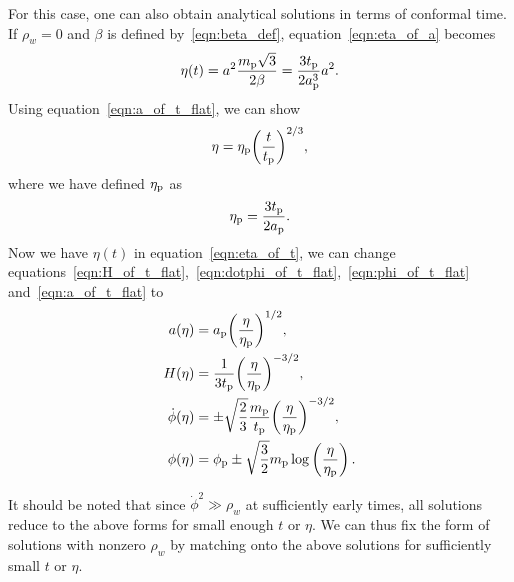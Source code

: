 For this case, one can also obtain analytical solutions in terms of conformal time.  If $\rho_w=0$ and $\beta$ is defined by~\eqref{eqn:beta_def}, equation~\eqref{eqn:eta_of_a} becomes
%
\begin{equation}
  \eta(t) 
  = 
  a^2 \frac{m_{\mathrm{p}}\sqrt{3}}{2\beta}
  =
  \frac{3t_{\mathrm{p}}}{2a_{\mathrm{p}}^3}a^2.
  \label{eqn:eta_of_t}
\end{equation}
%
Using equation~\eqref{eqn:a_of_t_flat}, we can show
%
\begin{equation}
  \eta
  =
  \eta_{\mathrm{p}}{\left(\frac{t}{t_{\mathrm{p}}}\right)}^{2/3},
\end{equation}
%
where we have defined $\eta_{\mathrm{p}}$ as
%
\begin{equation}
  \eta_{\mathrm{p}}
  =
  \frac{3t_{\mathrm{p}}}{2a_{\mathrm{p}}}.
  \label{eqn:etap_eq}
\end{equation}
%
Now we have $\eta(t)$ in equation~\eqref{eqn:eta_of_t}, we can change equations~\eqref{eqn:H_of_t_flat},~\eqref{eqn:dotphi_of_t_flat},~\eqref{eqn:phi_of_t_flat} and~\eqref{eqn:a_of_t_flat} to
%
\begin{align}
  a(\eta)
  &=
  a_{\mathrm{p}} {\left(\frac{\eta}{\eta_{\mathrm{p}}}\right)}^{1/2},
  \\
  H(\eta)
  &=
  \frac{1}{3t_{\mathrm{p}}}{\left(\frac{\eta}{\eta_{\mathrm{p}}}\right)}^{-3/2},
  \\
  \dot{\phi}(\eta)
  &=
  \pm\sqrt{\frac{2}{3}}
  \frac{m_{\mathrm{p}}}{t_{\mathrm{p}}}{\left(\frac{\eta}{\eta_{\mathrm{p}}}\right)}^{-3/2},
  \\
  \phi(\eta)
  &=
  \phi_{\mathrm{p}} \pm\sqrt{\frac{3}{2}}m_{\mathrm{p}}\log\left(\frac{\eta}{\eta_{\mathrm{p}}}\right). 
  \label{eqn:phi_flat}
\end{align}
%

It should be noted that since $\dot{\phi}^2 \gg \rho_w$ at sufficiently early times, all solutions reduce to the above forms for small enough $t$ or $\eta$. We can thus fix the form of solutions with nonzero $\rho_w$ by matching onto the above solutions for sufficiently small $t$ or $\eta$.  

